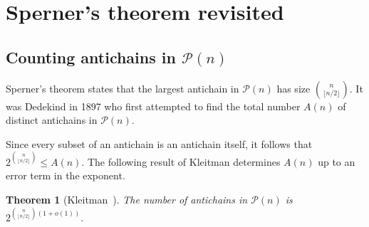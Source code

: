 \documentclass[11pt]{article}
\newtheorem{thm}[theorem]{Theorem}
\numberwithin{equation}{section}
\begin{document}










\section{Sperner's theorem revisited}
\subsection{Counting antichains in $\mathcal{P}(n)$}\label{seca}
  Sperner's theorem \cite{sperner}  states that the largest antichain  in $ \mathcal{P}(n)$ has size $\binom{n}{\lfloor n/2\rfloor}$. It was Dedekind \cite{dedekindsperner} in 1897 who first attempted to find the total number $A(n)$ of distinct antichains in $\mathcal{P}(n)$. %

Since every subset of an antichain is an antichain itself, it follows that  $2^{\binom{n}{\lfloor n/2\rfloor}}\leq A(n).$ 
The following result of Kleitman determines $A(n)$ up to an error term in the exponent.

\begin{thm}[Kleitman~\cite{kleitmansperner}]\label{numberofsperner}
The number of antichains in $\mathcal{P}(n)$ is $2^{\binom{n}{\lfloor n/2\rfloor}(1+o(1))}.$
\end{thm}
\end{document}
